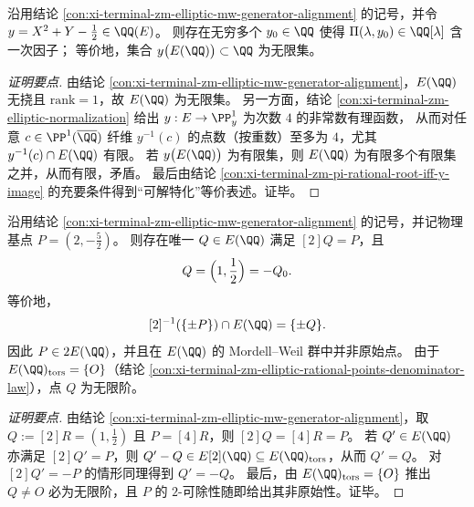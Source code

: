 \begin{conclusion}\label{con:xi-terminal-zm-pi-rational-root-infinite-y}
沿用结论 \ref{con:xi-terminal-zm-elliptic-mw-generator-alignment} 的记号，并令 \(y=X^2+Y-\tfrac12\in\QQ(E)\)。
则存在无穷多个 \(y_0\in\QQ\) 使得 \(\Pi(\lambda,y_0)\in\QQ[\lambda]\) 含一次因子；
等价地，集合 \(y\bigl(E(\QQ)\bigr)\subset\QQ\) 为无限集。
\end{conclusion}
\begin{proof}[证明要点]
由结论 \ref{con:xi-terminal-zm-elliptic-mw-generator-alignment}，\(E(\QQ)\) 无挠且 \(\mathrm{rank}=1\)，故 \(E(\QQ)\) 为无限集。
另一方面，结论 \ref{con:xi-terminal-zm-elliptic-normalization} 给出 \(y:E\to\PP^1_y\) 为次数 \(4\) 的非常数有理函数，
从而对任意 \(c\in\PP^1(\overline{\QQ})\) 纤维 \(y^{-1}(c)\) 的点数（按重数）至多为 \(4\)，尤其 \(y^{-1}(c)\cap E(\QQ)\) 有限。
若 \(y\bigl(E(\QQ)\bigr)\) 为有限集，则 \(E(\QQ)\) 为有限多个有限集之并，从而有限，矛盾。
最后由结论 \ref{con:xi-terminal-zm-pi-rational-root-iff-y-image} 的充要条件得到“可解特化”等价表述。证毕。
\end{proof}

\begin{conclusion}\label{con:xi-terminal-zm-elliptic-physical-basepoint-halving-uniqueness}
沿用结论 \ref{con:xi-terminal-zm-elliptic-mw-generator-alignment} 的记号，并记物理基点 \(P=(2,-\tfrac52)\)。
则存在唯一 \(Q\in E(\QQ)\) 满足 \([2]Q=P\)，且
\[
Q=\Bigl(1,\frac12\Bigr)=-Q_0.
\]
等价地，
\[
[2]^{-1}(\{\pm P\})\cap E(\QQ)=\{\pm Q\}.
\]
因此 \(P\in 2E(\QQ)\)，并且在 \(E(\QQ)\) 的 Mordell--Weil 群中并非原始点。
由于 \(E(\QQ)_{\mathrm{tors}}=\{O\}\)（结论 \ref{con:xi-terminal-zm-elliptic-rational-points-denominator-law}），点 \(Q\) 为无限阶。
\end{conclusion}
\begin{proof}[证明要点]
由结论 \ref{con:xi-terminal-zm-elliptic-mw-generator-alignment}，取 \(Q:=[2]R=(1,\tfrac12)\) 且 \(P=[4]R\)，则 \([2]Q=[4]R=P\)。
若 \(Q'\in E(\QQ)\) 亦满足 \([2]Q'=P\)，则 \(Q'-Q\in E[2](\QQ)\subseteq E(\QQ)_{\mathrm{tors}}\)，从而 \(Q'=Q\)。
对 \([2]Q'=-P\) 的情形同理得到 \(Q'=-Q\)。
最后，由 \(E(\QQ)_{\mathrm{tors}}=\{O\}\) 推出 \(Q\neq O\) 必为无限阶，且 \(P\) 的 \(2\)-可除性随即给出其非原始性。证毕。
\end{proof}

